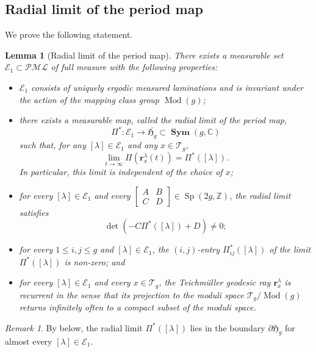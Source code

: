 \documentclass[dvipdfmx]{amsart}
\newtheorem{lemma}{Lemma}[section]
\theoremstyle{remark}
\newtheorem{remark}{Remark}[section]
\newcommand{\teich}{\mathcal{T}}
\newcommand{\tmod}{\operatorname{Mod}}
\newcommand{\ray}{{\boldsymbol r}}
\newcommand{\pml}{\mathcal{PML}}
\newcommand{\syp}{\mathop{Sp}}
\newcommand{\symm}{\mathop{\mathbf{Sym}}}
\begin{document}
\subsection{Radial limit of the period map}
We prove the following statement.
\begin{lemma}[Radial limit of the period map]
    \label{lem:radial_limit}
There exists a measurable set $\mathcal{E}_1\subset \pml$ of full measure with the following properties:
\begin{itemize}
    \item[(a)] $\mathcal{E}_1$ consists of uniquely ergodic measured laminations and is invariant under the action of the mapping class group
    $\tmod(g)$;
    \item[(b)] there exists a measurable map, called the radial limit of the period map,
    \[
    \Pi^*\colon \mathcal{E}_1\to \overline{\mathfrak{H}_g}
    \subset \symm(g,\mathbb{C})
    \]
    such that, for any $[\lambda]\in \mathcal{E}_1$ and any $x\in \teich_{g}$,
    \[
    \lim_{t\to \infty}\Pi(\ray^{\lambda}_x(t))=\Pi^*([\lambda]).
    \]
    In particular, this limit is independent of the choice of $x$;
    \item[(c)] for every $[\lambda]\in \mathcal{E}_1$ and every
    $\begin{bmatrix} A & B \\ C & D\end{bmatrix}\in \syp(2g,\mathbb{Z})$, the radial limit satisfies
    \[
    \det(-C\Pi^*([\lambda])+D)\ne 0;
    \]
    \item[(d)] for every $1\le i,j\le g$ and $[\lambda]\in \mathcal{E}_1$, the $(i,j)$-entry $\Pi^*_{ij}([\lambda])$ of the limit $\Pi^*([\lambda])$ is non-zero; and
    \item[(e)] for every $[\lambda]\in \mathcal{E}_1$ and every $x\in \teich_{g}$, the Teichm\"uller geodesic ray $\ray^{\lambda}_x$ is recurrent in the sense that its projection to the moduli space $\teich_{g}/\tmod(g)$ returns infinitely often to a compact subset of the moduli space.
\end{itemize}
\end{lemma}

\begin{remark}
By  below, the radial limit $\Pi^*([\lambda])$ lies in the boundary $\partial\mathfrak{H}_g$ for almost every $[\lambda]\in \mathcal{E}_1$.
\end{remark}
\end{document}
